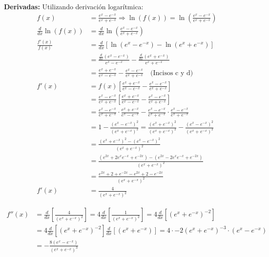 \documentclass[12pt]{article}
\begin{document}
\begin{enumerate}[\hspace{9px} a)]
        \textbf{Derivadas: } \quad Utilizando derivaci\'on logar\'itmica:
            \begin{align*}
                f(x) &= \frac{e^x-e^{-x}}{e^x+e^{-x}} \Longrightarrow \ln(f(x)) = \ln\left(\frac{e^x-e^{-x}}{e^x+e^{-x}}\right)\\
                \frac{d}{dx}\ln(f(x))&=\frac{d}{dx}\ln\left(\frac{e^x-e^{-x}}{e^x+e^{-x}}\right)\\
                \frac{f'(x)}{f(x)}&=\frac{d}{dx}\left[\ln(e^x-e^{-x})-\ln(e^x+e^{-x})\right]\\
                &=\frac{\frac{d}{dx}(e^x-e^{-x})}{e^x-e^{-x}}-\frac{\frac{d}{dx}(e^x+e^{-x})}{e^x+e^{-x}}\\
                &=\frac{e^x+e^{-x}}{e^x-e^{-x}}-\frac{e^x-e^{-x}}{e^x+e^{-x}} \quad \text{(Incisos c y d)}\\
                f'(x)&= f(x)\left[\frac{e^x+e^{-x}}{e^x-e^{-x}}-\frac{e^x-e^{-x}}{e^x+e^{-x}}\right]\\
                &= \frac{e^x-e^{-x}}{e^x+e^{-x}}\left[\frac{e^x+e^{-x}}{e^x-e^{-x}}-\frac{e^x-e^{-x}}{e^x+e^{-x}}\right]\\
                &= \frac{e^x-e^{-x}}{e^x+e^{-x}}\cdot\frac{e^x+e^{-x}}{e^x-e^{-x}} - \frac{e^x-e^{-x}}{e^x+e^{-x}}\cdot\frac{e^x-e^{-x}}{e^x+e^{-x}}\\
                &= 1- \frac{(e^x-e^{-x})^2}{(e^x+e^{-x})^2} = \frac{(e^x+e^{-x})^2}{(e^x+e^{-x})^2} - \frac{(e^x-e^{-x})^2}{(e^x+e^{-x})^2}\\
                &= \frac{(e^x+e^{-x})^2-(e^x-e^{-x})^2}{(e^x+e^{-x})^2}\\
                &= \frac{(e^{2x}+2e^xe^{-x}+e^{-2x})-(e^{2x}-2e^xe^{-x}+e^{-2x})}{(e^x+e^{-x})^2}\\
                &= \frac{e^{2x}+2+e^{-2x}-e^{2x}+2-e^{-2x}}{(e^x+e^{-x})^2}\\
                f'(x)&= \frac{4}{(e^x+e^{-x})^2}
            \end{align*}

            \begin{align*}
                f''(x) &= \frac{d}{dx}\left[\frac{4}{(e^x+e^{-x})^2}\right] = 4\frac{d}{dx}\left[\frac{1}{(e^x+e^{-x})^2}\right] = 4 \frac{d}{dx}\left[(e^x+e^{-x})^{-2}\right]\\
                &= 4\frac{d}{dx}\left[(e^x+e^{-x})^{-2}\right]\frac{d}{dx}\left[(e^x+e^{-x})\right] = 4\cdot-2(e^x+e^{-x})^{-3}\cdot(e^x-e^{-x})\\
                &= -\frac{8(e^x-e^{-x})}{(e^x+e^{-x})^3}
            \end{align*}


\end{enumerate}
\end{document}

